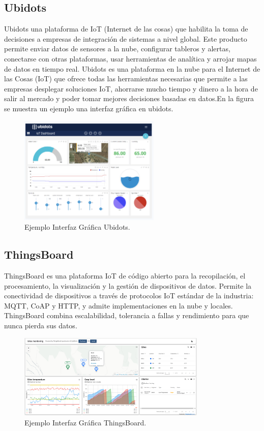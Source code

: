 \subsection{Ubidots}
Ubidots una plataforma de IoT (Internet de las cosas) que habilita la toma de decisiones a empresas de integración de sistemas a nivel global. Este producto permite enviar datos de sensores a la nube, configurar tableros y alertas, conectarse con otras plataformas, usar herramientas de analítica y arrojar mapas de datos en tiempo real.
Ubidots es una plataforma en la nube para el Internet de las Cosas (IoT) que ofrece todas las herramientas necesarias que permite a las empresas desplegar soluciones IoT, ahorrarse mucho tiempo y dinero a la hora de salir al mercado y poder tomar mejores decisiones basadas en datos.En la figura se muestra un ejemplo una interfaz gráfica en ubidots.
\begin{figure}[htbp]
	\centering
	\includegraphics[width=0.6\textwidth]{./Figures/ubidots.png}
	\caption{Ejemplo Interfaz Gráfica Ubidots.}
\end{figure}
\subsection{ThingsBoard}
ThingsBoard es una plataforma IoT de código abierto para la recopilación, el procesamiento, la visualización y la gestión de dispositivos de datos.
Permite la conectividad de dispositivos a través de protocolos IoT estándar de la industria: MQTT, CoAP y HTTP, y admite implementaciones en la nube y locales. ThingsBoard combina escalabilidad, tolerancia a fallas y rendimiento para que nunca pierda sus datos.
\begin{figure}[htbp]
	\centering
	\includegraphics[width=0.8\textwidth]{./Figures/thingsboard.png}
	\caption{Ejemplo Interfaz Gráfica ThingsBoard.}
\end{figure}